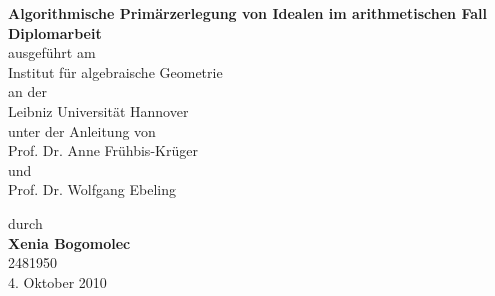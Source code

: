 \documentclass[a4paper,15pt]{article}
\begin{document}
\begin{titlepage}
\begin{center}
{\Huge{\textbf{Algorithmische Prim\"arzerlegung von Idealen im arithmetischen Fall}}}\\[2cm]

\huge{\textbf{Diplomarbeit}}\\[1cm]

\large{ausgef\"uhrt am}\\[0,2cm]

\Large{Institut f\"ur algebraische Geometrie}\\[0,2cm]

\large{an der} \\[0,2cm]

\Large{Leibniz Universit\"at Hannover}\\[1cm]


 \large{unter der Anleitung von} \\[0,2cm]

 \huge{Prof. Dr. Anne Fr\"uhbis-Kr\"uger}\\[0,2cm]
  
 \large{und }\\[0,2cm] 
 
 \huge{Prof. Dr. Wolfgang Ebeling}\\
 
 \vspace{1cm}
 
\large{durch }\\[0,2cm]
 
\Large{\textbf{Xenia Bogomolec}} \\[0,2cm]
 
2481950 \\[1cm]
 
\large{4. Oktober 2010}
\end{center}
\end{titlepage}
\end{document}
